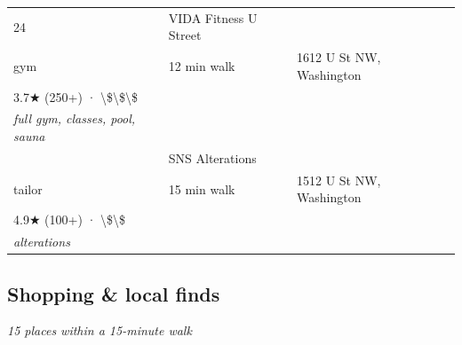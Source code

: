 \documentclass[11pt,a4paper]{article}
\begin{document}
{\begin{longtable}{@{}p{0.5cm}p{6.5cm}p{2.5cm}p{6.5cm}@{}}
24 & VIDA Fitness U Street \\ \textcolor{brandmuted}{\footnotesize gym} & 12 min walk & \textcolor{brandmuted}{\footnotesize 1612 U St NW,  Washington} \\ 3.7★ (250+) · \textbackslash{}\$\textbackslash{}\$\textbackslash{}\$ \\ \textit{full gym, classes, pool, sauna} \\
\addlinespace[2pt]
25 & SNS Alterations \\ \textcolor{brandmuted}{\footnotesize tailor} & 15 min walk & \textcolor{brandmuted}{\footnotesize 1512 U St NW,  Washington} \\ 4.9★ (100+) · \textbackslash{}\$\textbackslash{}\$ \\ \textit{alterations} \\
\bottomrule
\end{longtable}
}
\clearpage

\subsection{Shopping \& local finds}

\noindent\textit{15 places within a 15-minute walk}
\end{document}
